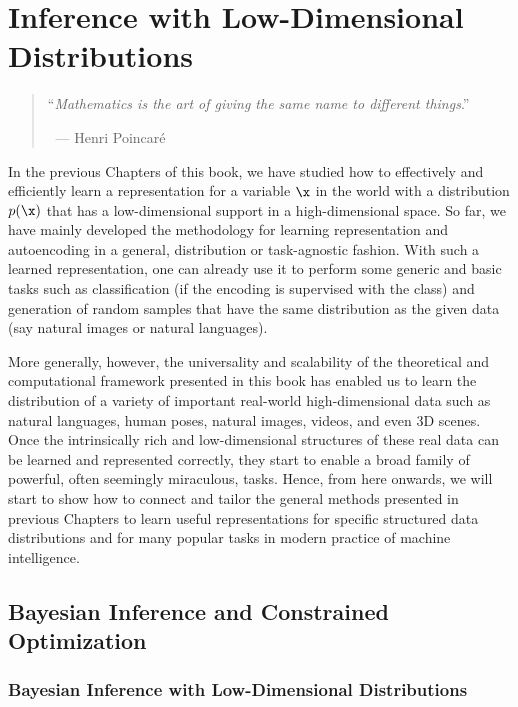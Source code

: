 \documentclass[../../book-main.tex]{subfiles}
\begin{document}
\chapter{Inference with Low-Dimensional Distributions}
\label{ch:conditional-inference}

\begin{quote}

    \hfill    ``{\em Mathematics is the art of giving the same name
    to different things}.''

    $~$ \hfill --- Henri Poincar\'e
\end{quote}
\vspace{5mm}

In the previous Chapters of this book, we have studied how to
effectively and efficiently learn a representation for a variable
$\x$ in the world with a distribution $p(\x)$ that has a
low-dimensional support in a high-dimensional space.  So far, we have
mainly developed the methodology for learning representation and
autoencoding in a general, distribution or task-agnostic fashion.
With such a learned representation, one can already use it to perform
some generic and basic tasks such as classification (if the encoding
is supervised with the class) and generation of random samples that
have the same distribution as the given data (say natural images or
natural languages).

More generally, however, the universality and scalability of the
theoretical and computational framework presented in this book has
enabled us to learn the distribution of a variety of important
real-world high-dimensional data such as natural languages, human
poses, natural images, videos, and even 3D scenes. Once the
intrinsically rich and low-dimensional structures of these real data
can be learned and represented correctly, they start to enable a
broad family of powerful, often seemingly miraculous, tasks. Hence,
from here onwards, we will start to show how to connect and tailor
the general methods presented in previous Chapters to learn useful
representations for specific structured data distributions and for
many popular tasks in modern practice of machine intelligence.

\section{Bayesian Inference and Constrained Optimization}

\subsection{Bayesian Inference with Low-Dimensional Distributions}
\end{document}
